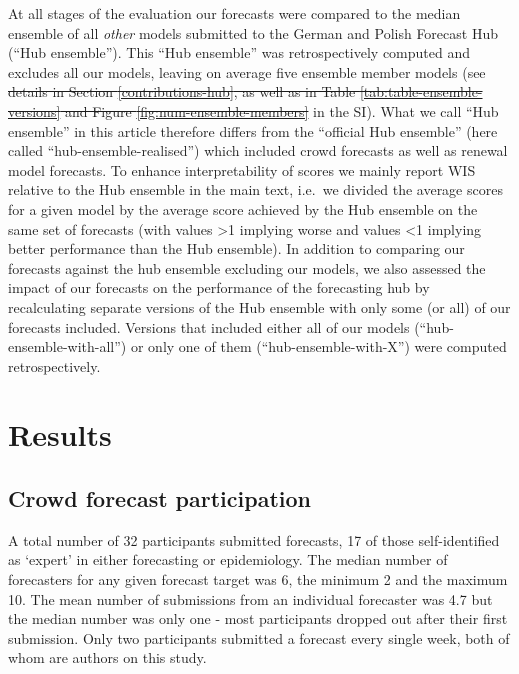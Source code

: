 \documentclass[10pt,letterpaper]{article}
\providecommand{\DIFaddtex}[1]{{\protect\color{blue}\uwave{#1}}} %
\providecommand{\DIFdeltex}[1]{{\protect\color{red}\sout{#1}}}                      %
\providecommand{\DIFaddbegin}{} %
\providecommand{\DIFaddend}{} %
\providecommand{\DIFdelbegin}{} %
\providecommand{\DIFdelend}{} %
\providecommand{\DIFadd}[1]{\texorpdfstring{\DIFaddtex{#1}}{#1}} %
\providecommand{\DIFdel}[1]{\texorpdfstring{\DIFdeltex{#1}}{}} %
\newcommand{\DIFscaledelfig}{0.5}
\newlength{\DIFdelgraphicswidth} %
\newlength{\DIFdelgraphicsheight} %
\newcommand{\DIFaddincludegraphics}[2][]{{\color{blue}\fbox{\DIFOincludegraphics[#1]{#2}}}} %
\newcommand{\DIFdelincludegraphics}[2][]{%
\sbox{\DIFdelgraphicsbox}{\DIFOincludegraphics[#1]{#2}}%
\settoboxwidth{\DIFdelgraphicswidth}{\DIFdelgraphicsbox} %
\settoboxtotalheight{\DIFdelgraphicsheight}{\DIFdelgraphicsbox} %
\scalebox{\DIFscaledelfig}{%
\parbox[b]{\DIFdelgraphicswidth}{\usebox{\DIFdelgraphicsbox}\\[-\baselineskip] \rule{\DIFdelgraphicswidth}{0em}}\llap{\resizebox{\DIFdelgraphicswidth}{\DIFdelgraphicsheight}{%
\setlength{\unitlength}{\DIFdelgraphicswidth}%
\begin{picture}(1,1)%
\thicklines\linethickness{2pt} %
{\color[rgb]{1,0,0}\put(0,0){\framebox(1,1){}}}%
{\color[rgb]{1,0,0}\put(0,0){\line( 1,1){1}}}%
{\color[rgb]{1,0,0}\put(0,1){\line(1,-1){1}}}%
\end{picture}%
}\hspace*{3pt}}} %
} %
\DeclareRobustCommand{\DIFaddbegin}{\DIFOaddbegin \let\includegraphics\DIFaddincludegraphics} %
\DeclareRobustCommand{\DIFaddend}{\DIFOaddend \let\includegraphics\DIFOincludegraphics} %
\DeclareRobustCommand{\DIFdelbegin}{\DIFOdelbegin \let\includegraphics\DIFdelincludegraphics} %
\DeclareRobustCommand{\DIFdelend}{\DIFOaddend \let\includegraphics\DIFOincludegraphics} %
\begin{document}
At all stages of the evaluation our forecasts were compared to the
median ensemble of all \emph{other} models submitted to the German and
Polish Forecast Hub (``Hub ensemble''). This ``Hub ensemble'' was
retrospectively computed and excludes all our models, leaving on average
five ensemble member models (see \DIFdelbegin \DIFdel{details in Section
\ref{contributions-hub}, as well as in Table
\ref{tab:table-ensemble-versions} and Figure
\ref{fig:num-ensemble-members} }\DIFdelend \DIFaddbegin {}
\DIFadd{and } \DIFaddend in the SI). What we call ``Hub
ensemble'' in this article therefore differs from the ``official Hub
ensemble'' (here called ``hub-ensemble-realised'') which included crowd
forecasts as well as renewal model forecasts. To enhance
interpretability of scores we mainly report WIS relative to the Hub
ensemble in the main text, i.e.~we divided the average scores for a
given model by the average score achieved by the Hub ensemble on the
same set of forecasts (with values \textgreater1 implying worse and
values \textless1 implying better performance than the Hub ensemble). In
addition to comparing our forecasts against the hub ensemble excluding
our models, we also assessed the impact of our forecasts on the
performance of the forecasting hub by recalculating separate versions of
the Hub ensemble with only some (or all) of our forecasts included.
Versions that included either all of our models
(``hub-ensemble-with-all'') or only one of them
(``hub-ensemble-with-X'') were computed retrospectively.

\hypertarget{results}{%
\section{Results}\label{results}}

\hypertarget{crowd-forecast-participation}{%
\subsection{Crowd forecast
participation}\label{crowd-forecast-participation}}

A total number of 32 participants submitted forecasts, 17 of those
self-identified as `expert' in either forecasting or epidemiology. The
median number of forecasters for any given forecast target was 6, the
minimum 2 and the maximum 10. The mean number of submissions from an
individual forecaster was 4.7 but the median number was only one - most
participants dropped out after their first submission. Only two
participants submitted a forecast every single week, both of whom are
authors on this study.
\end{document}

